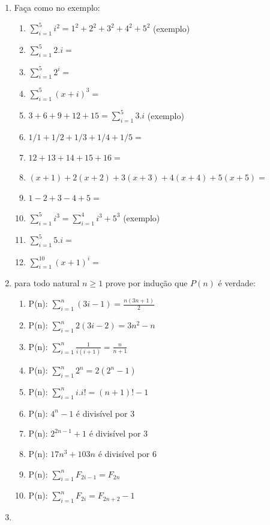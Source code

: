 \documentclass[a4paper,12pt]{letter}  %
\begin{document}
\begin{enumerate}
	\item Faça como no exemplo:
	\begin{enumerate}
        \item $\sum_{i=1}^5 i^2 = 1^2 +2^2 +3^2 +4^2 +5^2$ (exemplo)
        \item $\sum_{i=1}^5 2.i = $
        \item $\sum_{i=1}^5 2^i = $
        \item $\sum_{i=1}^5 (x+i)^3 = $
        \item $3 + 6+ 9 + 12 + 15 = \sum_{i=1}^5 3.i$ (exemplo)
        \item $ 1/1+ 1/2+1/3+1/4+1/5 = $
        \item $ 12 + 13 + 14 +15 + 16 = $
        \item $ (x+1) + 2(x+2) + 3(x+3) + 4(x+4) +5(x+5) =$ 
        \item $ 1 - 2 + 3 - 4 + 5 =$ 
        \item $\sum_{i=1}^5 i^3 = \sum_{i=1}^4 i^3 + 5^3$ (exemplo)
        \item $\sum_{i=1}^5 5.i =$ 
        \item $\sum_{i=1}^{10} (x+1)^i =$ 
    \end{enumerate}
	\item para todo natural $n\ge 1$ prove por indução que $P(n)$ é verdade:
	\begin{enumerate}
        \item P(n): $\sum_{i=1}^n (3i-1) = \frac{n(3n+1)}{2}$
        \item P(n): $\sum_{i=1}^n 2(3i-2) = 3n^2-n$
        \item P(n): $\sum_{i=1}^n \frac{1}{i(i+1)} = \frac{n}{n+1}$
        \item P(n): $\sum_{i=1}^n 2^n = 2(2^n-1)$
        \item P(n): $\sum_{i=1}^n i.i! = (n+1)!-1$
        \item P(n): $4^n -1$ é divisível por 3
        \item P(n): $2^{2n-1} +1$ é divisível por 3
        \item P(n): $17n^3 + 103n$ é divisível por 6
        \item P(n): $\sum_{i=1}^n F_{2i-1} = F_{2n}$
        \item P(n): $\sum_{i=1}^n F_{2i} = F_{2n+2}-1$
    \end{enumerate}
	\item 

\end{enumerate}
\end{document}
